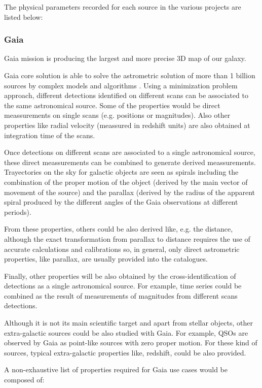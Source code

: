 \documentclass[11pt,a4paper]{ivoa}
\begin{document}
The physical parameters recorded for each source in the various projects are listed below:
\subsubsection{Gaia}
Gaia mission is producing the largest and more precise 3D map of our galaxy.

Gaia core solution is able to solve the astrometric solution of more than 1
billion sources by complex models and algorithms \citep{2012A&A...538A..78L}.
Using a minimization problem approach, different detections identified on
different scans can be associated to the same astronomical source. Some of the
properties would be direct meassurements on single scans (e.g. positions or
magnitudes). Also other properties like radial velocity (meassured in redshift
units) are also obtained at integration time of the scans.

Once detections on different scans are associated to a single astronomical
source, these direct meassurements can be combined to generate derived 
meassurements. Trayectories on the sky for galactic objects are seen as
spirals including the combination of the proper motion of the object 
(derived by the main vector of movement of the source) and the parallax 
(derived by the radius of the apparent spiral produced by the different
angles of the Gaia observations at different periods).

From these properties, others could be also derived like, e.g. the distance,
although the exact transformation from parallax to distance requires the use of
accurate calculations and calibrations so, in general, only direct astrometric
properties, like parallax, are usually provided into the catalogues.

Finally, other properties will be also obtained by the cross-identification of
detections as a single astronomical source. For example, time series could be
combined as the result of measurements of magnitudes from different scans
detections.

Although it is not its main scientific target and apart from stellar objects,
other extra-galactic sources could be also studied with Gaia. For example, QSOs
are observed by Gaia as point-like sources with zero proper motion. For these
kind of sources, typical extra-galactic properties like, redshift, could be also
provided.

A non-exhaustive list of properties required for Gaia use cases would be composed
of:
\end{document}
